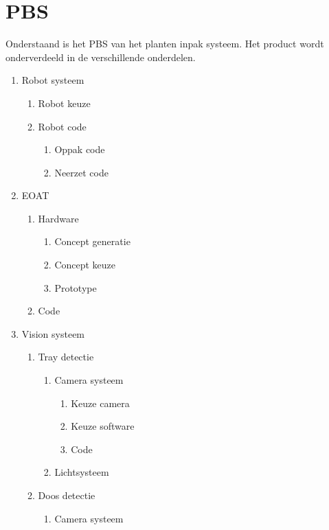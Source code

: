 
\section*{PBS}

Onderstaand is het PBS van het planten inpak systeem. Het product wordt onderverdeeld in de verschillende onderdelen.

\begin{enumerate}[label*=\arabic*.]
	\item Robot systeem
	\begin{enumerate}[label*=\arabic*.]
		\item Robot keuze
		\item Robot code
		\begin{enumerate}[label*=\arabic*.]
			\item Oppak code
			\item Neerzet code
		\end{enumerate}
	\end{enumerate}
	\item EOAT
	\begin{enumerate}[label*=\arabic*.]
		\item Hardware
		\begin{enumerate}[label*=\arabic*.]
			\item Concept generatie
			\item Concept keuze
			\item Prototype
		\end{enumerate}
		\item Code
	\end{enumerate}
	\item Vision systeem
	\begin{enumerate}[label*=\arabic*.]
		\item Tray detectie
		\begin{enumerate}[label*=\arabic*.]
			\item Camera systeem
			\begin{enumerate}[label*=\arabic*.]
				\item Keuze camera
				\item Keuze software
				\item Code
			\end{enumerate}
			\item Lichtsysteem
		\end{enumerate}
		\item Doos detectie
			\begin{enumerate}[label*=\arabic*.]
				\item Camera systeem

\end{enumerate}
\end{enumerate}
\end{enumerate}
